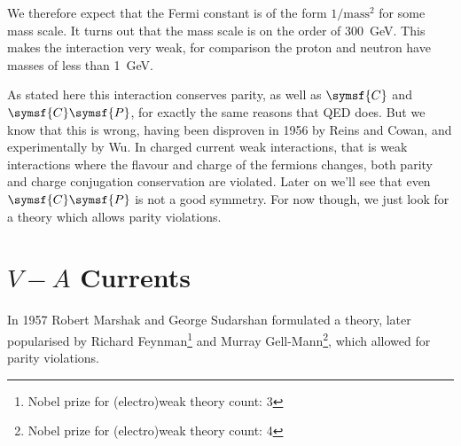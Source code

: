 \documentclass[fleqn]{NotesClass}
\newcommand{\chargeConjugation}{\symsf{C}}
\newcommand{\parity}{\symsf{P}}
\begin{document}
    We therefore expect that the Fermi constant is of the form \(1/\text{mass}^2\) for some mass scale.
    It turns out that the mass scale is on the order of \qty{300}{\giga\electronvolt}.
    This makes the interaction very weak, for comparison the proton and neutron have masses of less than \qty{1}{\giga\electronvolt}.
    
    As stated here this interaction conserves parity, as well as \(\chargeConjugation\) and \(\chargeConjugation\parity\), for exactly the same reasons that QED does.
    But we know that this is wrong, having been disproven in 1956 by Reins and Cowan, and experimentally by Wu.
    In charged current weak interactions, that is weak interactions where the flavour and charge of the fermions changes, both parity and charge conjugation conservation are violated.
    Later on we'll see that even \(\chargeConjugation\parity\) is not a good symmetry.
    For now though, we just look for a theory which allows parity violations.
    
    \section{\texorpdfstring{\(V - A\)}{V - A} Currents}
    In 1957 Robert Marshak and George Sudarshan formulated a theory, later popularised by Richard Feynman\footnote{Nobel prize for (electro)weak theory count: 3} and Murray Gell-Mann\footnote{Nobel prize for (electro)weak theory count: 4}, which allowed for parity violations.
    
\end{document}
